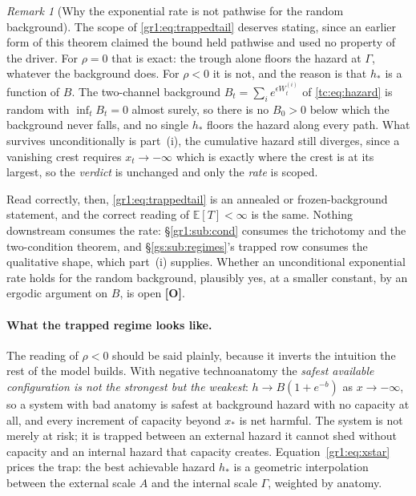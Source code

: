 \documentclass[11pt]{article}
\numberwithin{equation}{section}
\theoremstyle{plain}
\theoremstyle{definition}
\theoremstyle{remark}
\newtheorem{remark}[theorem]{Remark}
\newcommand{\E}{\mathbb{E}}
\begin{document}
\begin{remark}[Why the exponential rate is not pathwise for the random
background]\label{gr1:rem:trappedscope}
The scope of \eqref{gr1:eq:trappedtail} deserves stating, since an
earlier form of this theorem claimed the bound held pathwise and used no
property of the driver. For $\rho=0$ that is exact: the trough alone floors the hazard at
$\Gamma$, whatever the background does. For $\rho<0$ it is not, and the
reason is that $h_\ast$ is a function of $B$. The two-channel background
$B_t=\sum_i e^{\epsilon W^{(i)}_t}$ of \eqref{tc:eq:hazard} is random with
$\inf_t B_t=0$ almost surely, so there is no $B_0>0$ below which the
background never falls, and no single $h_\ast$ floors the hazard along
every path. What survives unconditionally is part~(i), the cumulative
hazard still diverges, since a vanishing crest requires $x_t\to-\infty$
which is exactly where the crest is at its largest, so the
\emph{verdict} is unchanged and only the \emph{rate} is scoped.

Read correctly, then, \eqref{gr1:eq:trappedtail} is an annealed or
frozen-background statement, and the correct reading of $\E[T]<\infty$ is
the same. Nothing downstream consumes the rate: \S\ref{gr1:sub:cond}
consumes the trichotomy and the two-condition theorem, and
\S\ref{gs:sub:regimes}'s trapped row consumes the qualitative shape,
which part~(i) supplies. Whether an unconditional exponential rate holds
for the random background, plausibly yes, at a smaller constant, by an
ergodic argument on $B$, is open \textbf{[O]}.
\end{remark}

\paragraph{What the trapped regime looks like.}\label{gr1:rem:trapped}
The reading of $\rho<0$ should be said plainly, because it inverts the
intuition the rest of the model builds. With negative technoanatomy the
\emph{safest available configuration is not the strongest but the
weakest}: $h\to B(1+e^{-b})$ as $x\to-\infty$, so a system with bad
anatomy is safest at background hazard with no capacity at all, and
every increment of capacity beyond $x_\ast$ is net harmful. The system
is not merely at risk; it is trapped between an external hazard it
cannot shed without capacity and an internal hazard that capacity
creates. Equation~\eqref{gr1:eq:xstar} prices the trap: the best
achievable hazard $h_\ast$ is a geometric interpolation between the
external scale $A$ and the internal scale $\Gamma$, weighted by anatomy.
\end{document}
